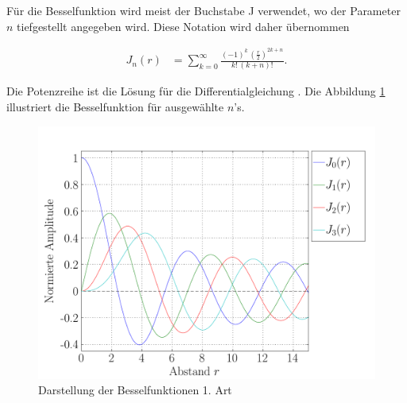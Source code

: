 \begin{normalsize}%
F\"ur die Besselfunktion wird meist der Buchstabe J verwendet,
wo der Parameter $n$ tiefgestellt angegeben wird.
Diese Notation wird daher \"ubernommen
\end{normalsize}
\begin{align}
	J_n \left( r \right)
	&=
	\sum_{k=0} ^{\infty}
	\frac
	{
		\left( - 1 \right) ^k \, 
		\left(		
		\frac
		{
			r
		}{
			2
		} \right) ^{2k+n}
	}{
		{k}! \, { \left( k + n \right) }!
	}
	\label{eq:bessel:summenformel}
	\text{.}
\end{align}
\begin{normalsize}%
Die Potenzreihe  ist die L\"osung f\"ur die Differentialgleichung .
Die Abbildung \ref{img:besselfunction} illustriert die Besselfunktion  f\"ur ausgew\"ahlte $n$'s.
\end{normalsize}
\begin{figure}[h]
	\begin{center}
		\includegraphics[scale=0.5]{kreis/besselfunction.pdf}
		\caption[Besselfunktion 1. Art]{Darstellung der Besselfunktionen 1. Art}
		\label{img:besselfunction}
	\end{center}
\end{figure}

